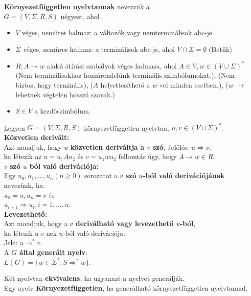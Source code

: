 \begin{frame}
\begin{tcolorbox}[title={Def.: Környezetfüggetlen nyelvtan}]
\textbf{Környezetfüggetlen nyelvtannak} nevezzük a\\
$G = (V, {\Sigma}, R, S)$ négyest, ahol\\
\begin{itemize}
\item $V$ véges, nemüres halmaz: a változók vagy nemterminálisok abc-je
\item $\Sigma$ véges, nemüres halmaz: a terminálisok abc-je, ahol $V \cap \Sigma = \emptyset$ (Betűk)
\item $R : A \rightarrow w$ alakú átírási szabályok véges halmaza, ahol $A \in V, w \in (V \cup {\Sigma})^*$\\
(Nem terminálisokhoz hozzárendelünk terminális szimbólumokat.), (Nem biztos, hogy terminális), ($A$ helyettesíthető a $w$-vel minden esetben.), ($w$ $\rightarrow$ lehetnek végtelen hosszú szavak.)
\item $S \in V$ a kezdőszimbólum.
\end{itemize}
\end{tcolorbox}

\begin{tcolorbox}[title={Def.: Deriváció, közvetlen derivált}]
Legyen $G = (V, {\Sigma}, R, S)$ környezetfüggetlen nyelvtan, $u, v \in (V \cup {\Sigma})^*$.\\
\mmedskip
\textbf{Közvetlen derivált:}\\
Azt mondjuk, hogy \textbf{$u$ közvetlen deriváltja a $v$ szó}, Jelölés: $u \Rightarrow v$,\\
ha létezik az $u = u_1Au_2$ és $v = u_1wu_2$ felbontás úgy, hogy $A  \rightarrow w \in R$.\\
\mmedskip
\textbf{$v$ szó $u$ ból való derivációja:}\\
Egy $u_0, u_1, ..., u_n (n \geq 0)$ sorozatot a \textbf{$v$ szó $u$-ból való derivációjának} nevezünk, ha:\\
$u_0 = u, u_n = v$ és\\
$u_{i - 1} \Rightarrow u_i, i = 1, ..., n$.\\
\mmedskip
\textbf{Levezethető:}\\
Azt mondjuk, hogy a \textbf{$v$ deriválható vagy levezethető $u$-ból},
\\ha létezik a $v$-nek $u$-ból való derivációja.\\
Jele: $u {\Rightarrow}^* v$.\\
\mmedskip
A \textbf{$G$ által generált nyelv}:\\
$L(G) = \{w \in {\Sigma}^* : S {\Rightarrow}^* w\}$.

\end{tcolorbox}

\begin{tcolorbox}[squeezed title={Def.: Nyelvtanok ekvivalenciája, Környezetfüggetlen nyelv}]
Két nyelvtan \textbf{ekvivalens}, ha ugyanazt a nyelvet generálják.\\
Egy nyelv \textbf{Környezetfüggetlen}, ha generálható környezetfüggetlen nyelvtannal.
\end{tcolorbox}

\end{frame}


